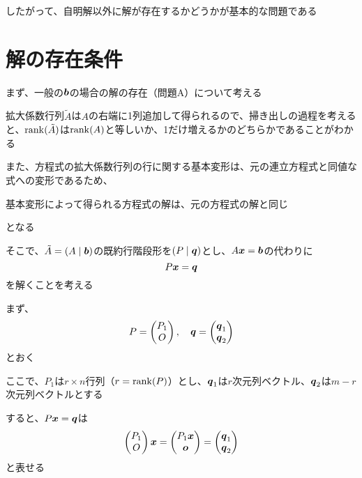 \documentclass[../../../topic_linear-algebra]{subfiles}
\begin{document}
したがって、自明解以外に解が存在するかどうかが基本的な問題である

\sectionline
\section{解の存在条件}

まず、一般の$\vb*{b}$の場合の解の存在（問題A）について考える

\br

拡大係数行列$\tilde{A}$は$A$の右端に1列追加して得られるので、掃き出しの過程を考えると、$\rank(\tilde{A})$は$\rank(A)$と等しいか、1だけ増えるかのどちらかであることがわかる

\br

また、方程式の拡大係数行列の行に関する基本変形は、元の連立方程式と同値な式への変形であるため、
\begin{shaded}
  基本変形によって得られる方程式の解は、元の方程式の解と同じ
\end{shaded}
となる

\br

そこで、$\tilde{A} = (A \mid \vb*{b})$の既約行階段形を$(P \mid \vb*{q})$とし、$A\vb*{x} = \vb*{b}$の代わりに
\begin{equation*}
  P\vb*{x} = \vb*{q}
\end{equation*}
を解くことを考える

\br

まず、
\begin{equation*}
  P = \begin{pmatrix}
    P_1 \\
    O
  \end{pmatrix}, \quad
  \vb*{q} = \begin{pmatrix}
    \vb*{q}_1 \\
    \vb*{q}_2
  \end{pmatrix}
\end{equation*}
とおく

ここで、$P_1$は$r \times n$行列（$r = \rank(P)$）とし、$\vb*{q}_1$は$r$次元列ベクトル、$\vb*{q}_2$は$m - r$次元列ベクトルとする

\br

すると、$P\vb*{x} = \vb*{q}$は
\begin{equation*}
  \begin{pmatrix}
    P_1 \\
    O
  \end{pmatrix} \vb*{x}
  = \begin{pmatrix}
    P_1 \vb*{x} \\
    \vb*{o}
  \end{pmatrix}
  = \begin{pmatrix}
    \vb*{q}_1 \\
    \vb*{q}_2
  \end{pmatrix}
\end{equation*}
と表せる
\end{document}
